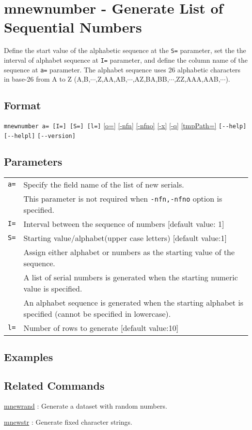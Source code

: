 
%

\section{mnewnumber - Generate List of Sequential Numbers\label{sect:mnewnumber}}
Define the start value of the alphabetic sequence at the \verb|S=| parameter, set the the interval of alphabet sequence at \verb|I=| parameter, and define the column name of the sequence at \verb|a=| parameter. 
The alphabet sequence uses 26 alphabetic characters in base-26 from A to Z (A,B,$\cdots$,Z,AA,AB,$\cdots$,AZ,BA,BB,$\cdots$,ZZ,AAA,AAB,$\cdots$).



\subsection*{Format}
\verb|mnewnumber a= [I=] [S=] [l=]|
\hyperref[sect:option_o]{[o=]}
\hyperref[sect:option_nfn]{[-nfn]} 
\hyperref[sect:option_nfno]{[-nfno]}  
\hyperref[sect:option_x]{[-x]}
\hyperref[sect:option_q]{[-q]}
\hyperref[sect:option_option_tmppath]{[tmpPath=]}
\verb|[--help]|
\verb|[--helpl]|
\verb|[--version]|\\

\subsection*{Parameters}
\begin{table}[htbp]
{\small
\begin{tabular}{ll}
\verb|a=|    & Specify the field name of the list of new serials.\\
             & This parameter is not required when \verb|-nfn,-nfno| option is specified. \\
\verb|I=|    & Interval between the sequence of numbers [default value: 1]\\
\verb|S=|    & Starting value/alphabet(upper case letters) [default value:1]\\
             & Assign either alphabet or numbers as the starting value of the sequence.\\
             & A list of serial numbers is generated when the starting numeric value is specified. \\
             & An alphabet sequence is generated when the starting alphabet is specified (cannot be specified in lowercase). \\
\verb|l=|    & Number of rows to generate [default value:10]\\
\end{tabular} 
}
\end{table} 


\subsection*{Examples}


\subsection*{Related Commands}
\hyperref[sect:mnewrand] {mnewrand} : Generate a dataset with random numbers. 

\hyperref[sect:mnewstr] {mnewstr} : Generate fixed character strings. 

%
